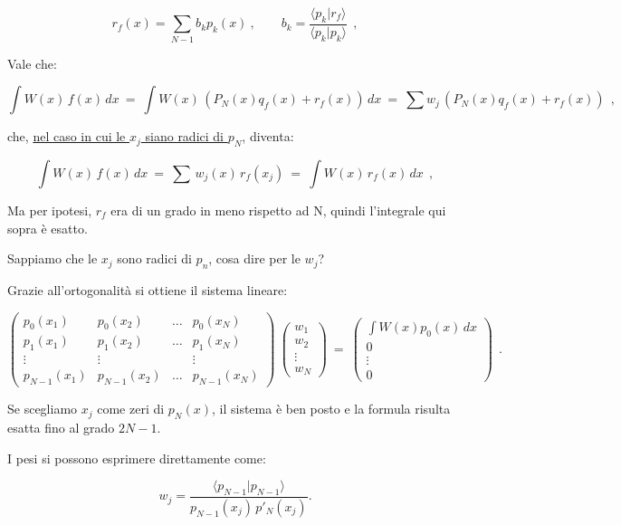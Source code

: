 \[ r_f(x)=\sum_{N-1} b_k p_k (x)\ , \qquad b_k=\frac{\langle p_k|r_f\rangle}{\langle p_k |p_k\rangle}\ \ ,\]

Vale che:

\[ \int W(x)\,f(x)\,dx\ =\ \int W(x)\, (P_N(x)q_f(x) + r_f(x))\, dx\ =\ \sum w_j\, (P_N(x)q_f(x) + r_f(x))\ \ , \]

che, \underline{nel caso in cui le $x_j$ siano radici di $p_N$}, diventa:

\[ \int W(x)\,f(x)\,dx\ =\  \sum\, w_j(x)\, r_f(x_j) \ =\ \int W(x)\, r_f(x)\, dx\ \ , \]

Ma per ipotesi, $r_f$ era di un grado in meno rispetto ad N, quindi l'integrale qui sopra è esatto.

Sappiamo che le $x_j$ sono radici di $p_n$, cosa dire per le $w_j$?  

Grazie all'ortogonalità si ottiene il sistema lineare:

\[ \begin{pmatrix}
	p_0(x_1) & p_0(x_2) & \dots & p_0(x_N) \\
	p_1(x_1) & p_1(x_2) & \dots & p_1(x_N) \\
	\vdots   & \vdots   &       & \vdots   \\
	p_{N-1}(x_1) & p_{N-1}(x_2) & \dots & p_{N-1}(x_N)
\end{pmatrix}\
\begin{pmatrix}
	w_1 \\ w_2 \\ \vdots \\ w_N
\end{pmatrix}
\ =\
\begin{pmatrix}
	\int W(x)p_0(x)\,dx \\
	0 \\
	\vdots \\
	0
\end{pmatrix}\ \ .\]

Se scegliamo $x_j$ come zeri di $p_N(x)$, il sistema è ben posto e la formula risulta esatta fino al grado $2N-1$.

I pesi si possono esprimere direttamente come:

\[
w_j
=
\frac{\langle p_{N-1}|p_{N-1}\rangle}
{p_{N-1}(x_j)\, p'_N(x_j)}.
\]


